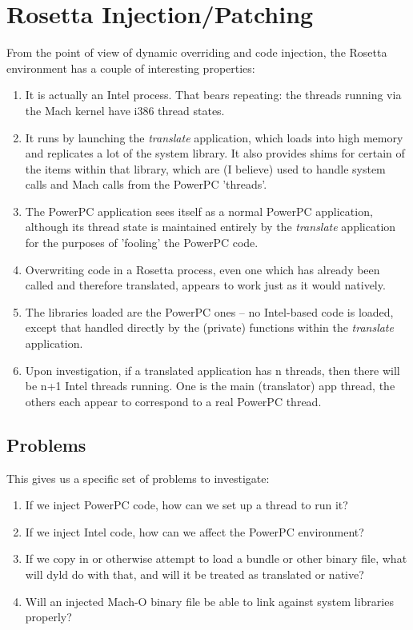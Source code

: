 \documentclass[english]{article}
\begin{document}
\section{Rosetta Injection/Patching}

From the point of view of dynamic overriding and code injection, the Rosetta environment has a couple of interesting properties:

\begin{enumerate}
  \item It is actually an Intel process. That bears repeating: the threads running via the Mach kernel have i386 thread states.
  \item It runs by launching the \textsl{translate} application, which loads into high memory and replicates a lot of the system library. It also provides shims for certain of the items within that library, which are (I believe) used to handle system calls and Mach calls from the PowerPC 'threads'.
  \item The PowerPC application sees itself as a normal PowerPC application, although its thread state is maintained entirely by the \textsl{translate} application for the purposes of 'fooling' the PowerPC code.
  \item Overwriting code in a Rosetta process, even one which has already been called and therefore translated, appears to work just as it would natively.
  \item The libraries loaded are the PowerPC ones -- no Intel-based code is loaded, except that handled directly by the (private) functions within the \textsl{translate} application.
  \item Upon investigation, if a translated application has n threads, then there will be n+1 Intel threads running. One is the main (translator) app thread, the others each appear to correspond to a real PowerPC thread.
\end{enumerate}

\subsection{Problems}

This gives us a specific set of problems to investigate:

\begin{enumerate}
  \item If we inject PowerPC code, how can we set up a thread to run it?
  \item If we inject Intel code, how can we affect the PowerPC environment?
  \item If we copy in or otherwise attempt to load a bundle or other binary file, what will dyld do with that, and will it be treated as translated or native?
  \item Will an injected Mach-O binary file be able to link against system libraries properly?
\end{enumerate}
\end{document}
